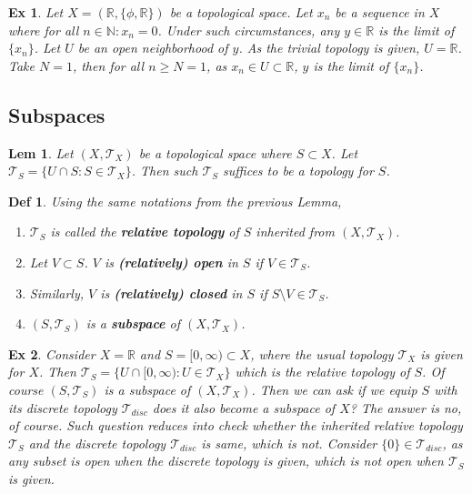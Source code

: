 \documentclass[paper=a4, fontsize=11pt]{scrartcl}
\newcommand{\T}{\mathcal{T}}
\newtheorem{definition}{Def}
\newtheorem{example}{Ex}
\newtheorem{lemma}{Lem}
\begin{document}
\begin{example}
	Let $X=(\mathbb{R},\{\phi,\mathbb{R}\})$ be a topological space. Let $x_n$ be a sequence in $X$ where for all $n\in \mathbb{N} : x_n=0$. Under such circumstances, any $y\in\mathbb{R}$ is the limit of $\{x_n\}$. Let $U$ be an open neighborhood of $y$. As the trivial topology is given, $U=\mathbb{R}$. Take $N=1$, then for all $n\geq N=1$, as $x_n\in U \subset \mathbb{R}$, $y$ is the limit of $\{x_n\}$.
\end{example}

\vspace{0.15in}
\subsection{Subspaces}
\vspace{0.1in}

\begin{lemma}
	Let $(X,\T_X)$ be a topological space where $S\subset X$. Let $\T_S = \{U \cap S : S \in\T_X \}$. Then such $\T_S$ suffices to be a topology for $S$.
\end{lemma}

\vspace{0.15in}

\begin{definition}
Using the same notations from the previous Lemma, 
\begin{enumerate}[label=\arabic*)]
	\item $\T_S$ is called the \textbf{relative topology} of $S$ inherited from $(X,\T_X)$.
	\item Let $V \subset S$. $V$ is \textbf{(relatively) open} in $S$ if $V \in \T_S$.
	\item Similarly, $V$ is \textbf{(relatively) closed} in $S$ if $S\setminus V \in \T_S$.
	\item  $(S,\T_S)$ is a \textbf{subspace} of $(X,\T_X)$.
\end{enumerate}
\end{definition}

\vspace{0.15in}

\begin{example}
Consider $X=\mathbb{R}$ and $S=[0,\infty)\subset X$, where the usual topology $\T_X$ is given for $X$. Then $\T_S = \{ U \cap [0,\infty) : U \in \T_X \}$ which is the relative topology of $S$. Of course $(S,\T_S)$ is a subspace of $(X,\T_X)$. Then we can ask if we equip $S$ with its discrete topology $\T_{disc}$ does it also become a subspace of $X$? The answer is no, of course. Such question reduces into check whether the inherited relative topology $\T_S$ and the discrete topology $\T_{disc}$ is same, which is not. Consider $\{0\}\in \T_{disc}$, as any subset is open when the discrete topology is given, which is not open when $\T_S$ is given.
\end{example}
\end{document}

